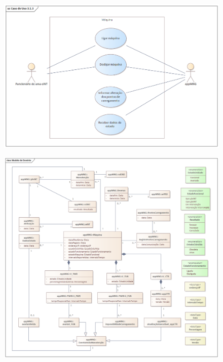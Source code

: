 \documentclass{article}
\begin{document}
    \begin{figure}[H]
        \centering
        \vspace*{1.4cm}
        \includegraphics[origin=c, angle=-90]{3rd_Use_Case.png}
    \end{figure}

    \begin{figure}[H]
        \centering
        \vspace*{1.4cm}
        \hspace*{-1.75cm}
        \includegraphics[origin=c, angle=-90, scale = 0.8]{Domain_Model.png}
    \end{figure}
\end{document}
